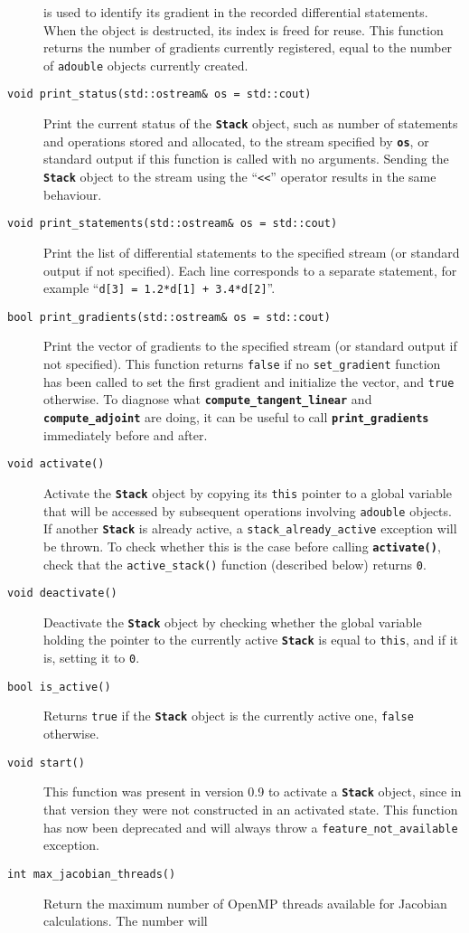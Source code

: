 \documentclass[a4,oneside]{book}
\def\codesize{\small}
\def\code#1{{\codesize\texttt{#1}}}
\def\codebf#1{{\codesize\texttt{\textbf{#1}}}}
\def\citem#1{\item[{\codesize\texttt{#1}}]}
\begin{document}
\begin{description}
is used to identify its gradient in the recorded differential
statements. When the object is destructed, its index is freed for
reuse. This function returns the number of gradients currently
registered, equal to the number of \code{adouble} objects currently
created.
%
\citem{void print\_status(std::ostream\&\ os = std::cout)} Print the
current status of the \codebf{Stack} object, such as number of
statements and operations stored and allocated, to the stream
specified by \codebf{os}, or standard output if this function is
called with no arguments.  Sending the \codebf{Stack} object to the
stream using the ``\code{<<}'' operator results in the same behaviour.
%
\citem{void print\_statements(std::ostream\&\ os = std::cout)} Print
the list of differential statements to the specified stream (or
standard output if not specified). Each line corresponds to a separate
statement, for example ``\code{d[3] = 1.2*d[1] + 3.4*d[2]}''.
%
\citem{bool print\_gradients(std::ostream\&\ os = std::cout)} Print
the vector of gradients to the specified stream (or standard output if
not specified). This function returns
\code{false} if no \code{set\_gradient}
function has been called to set the first gradient and initialize the
vector, and \code{true} otherwise. To diagnose what
\codebf{compute\_tangent\_linear} and 
\codebf{compute\_adjoint} are doing, it can be useful to call
\codebf{print\_gradients} immediately before and after.
%
\citem{void activate()} Activate the \codebf{Stack} object by copying
its \code{this} pointer to a global variable that will be accessed by
subsequent operations involving \code{adouble} objects.  If another
\codebf{Stack} is already active, a \code{stack\_already\_active}
exception will be thrown. To check whether this is the case before
calling \codebf{activate()}, check that the \code{active\_stack()}
function (described below) returns \code{0}.
%
\citem{void deactivate()} Deactivate the \codebf{Stack} object by
checking whether the global variable holding the pointer to the
currently active \codebf{Stack} is equal to \code{this}, and if it is,
setting it to \code{0}.
%
\citem{bool is\_active()} Returns \code{true} if the \codebf{Stack}
object is the currently active one, \code{false} otherwise.
%
\citem{void start()} This function was present in version 0.9 to
activate a \codebf{Stack} object, since in that version they were not
constructed in an activated state.  This function has now been
deprecated and will always throw a \code{feature\_not\_available}
exception.
\citem{int max\_jacobian\_threads()} Return the maximum number of
OpenMP threads available for Jacobian calculations.  The number will

\end{description}
\end{document}
